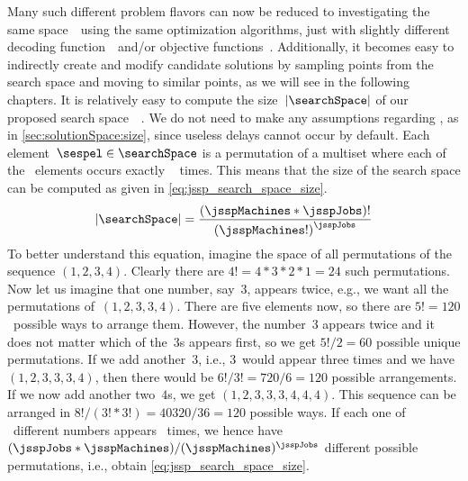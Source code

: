 Many such different problem flavors can now be reduced to investigating the same space~\searchSpace\ using the same optimization algorithms, just with slightly different decoding function~\decode\ and/or objective functions~\objf.
Additionally, it becomes  easy to indirectly create and modify candidate solutions by sampling points from the search space and moving to similar points, as we will see in the following chapters.
\endhsection%
%
%
\label{sec:size_of_jssp_search_space}%
%
It is relatively easy to compute the size~$\left|\searchSpace\right|$ of our proposed search space~\searchSpace~\cite{SIS1997NESFSJSPBGA}.
We do not need to make any assumptions regarding , as in \cref{sec:solutionSpace:size}, since useless delays cannot occur by default.
Each element~$\sespel\in\searchSpace$ is a permutation of a multiset where each of the \jsspJobs~elements occurs exactly \jsspMachines~ times.
This means that the size of the search space can be computed as given in \cref{eq:jssp_search_space_size}.%
%
\begin{align}%
\left|\searchSpace\right| = \frac{\left(\jsspMachines*\jsspJobs\right)!}{ \left(\jsspMachines!\right)^{\jsspJobs} }%
\label{eq:jssp_search_space_size}%
\end{align}%
%
To better understand this equation, imagine the space of all permutations of the sequence $(1, 2, 3, 4)$.
Clearly there are $4!=4*3*2*1=24$ such permutations.
Now let us imagine that one number, say~$3$, appears twice, e.g., we want all the permutations of~$(1, 2, 3, 3, 4)$.
There are five elements now, so there are $5!=120$~possible ways to arrange them.
However, the number~$3$ appears twice and it does not matter which of the~$3$s appears first, so we get $5!/2=60$ possible unique permutations.
If we add another~$3$, i.e., $3$~would appear three times and we have~$(1, 2, 3, 3, 3, 4)$, then there would be $6!/3!=720/6=120$ possible arrangements.
If we now add another two~$4$s, we get $(1, 2, 3, 3, 3, 4, 4, 4)$.
This sequence can be arranged in $8!/(3!*3!)=40320/36=120$ possible ways.
If each one of \jsspJobs~different numbers appears \jsspMachines~times, we hence have $(\jsspJobs*\jsspMachines)/(\jsspMachines)^{\jsspJobs}$ different possible permutations, i.e., obtain \cref{eq:jssp_search_space_size}.

